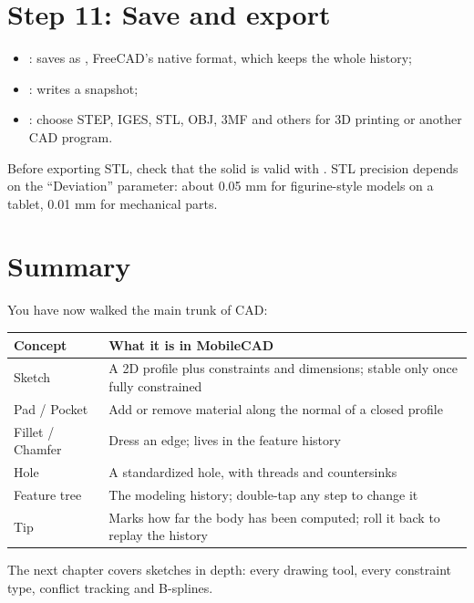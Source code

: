 \section{Step 11: Save and export}

\begin{itemize}
  \item {}: saves as , FreeCAD's native format, which keeps the whole history;
  \item {}: writes a snapshot;
  \item {}: choose STEP, IGES, STL, OBJ, 3MF and others for 3D printing or another CAD
        program.
\end{itemize}

\begin{tip}
Before exporting STL, check that the solid is valid with . STL precision depends on
the “Deviation” parameter: about 0.05 mm for figurine-style models on a tablet, 0.01 mm for mechanical parts.
\end{tip}

\section{Summary}

You have now walked the main trunk of CAD:

\begin{center}
\small
\begin{tabularx}{\linewidth}{@{}lX@{}}
\toprule
\textbf{Concept} & \textbf{What it is in MobileCAD} \\
\midrule
Sketch & A 2D profile plus constraints and dimensions; stable only once fully constrained \\
Pad / Pocket & Add or remove material along the normal of a closed profile \\
Fillet / Chamfer & Dress an edge; lives in the feature history \\
Hole & A standardized hole, with threads and countersinks \\
Feature tree & The modeling history; double-tap any step to change it \\
Tip & Marks how far the body has been computed; roll it back to replay the history \\
\bottomrule
\end{tabularx}
\end{center}

The next chapter covers sketches in depth: every drawing tool, every constraint type, conflict tracking and
B-splines.
